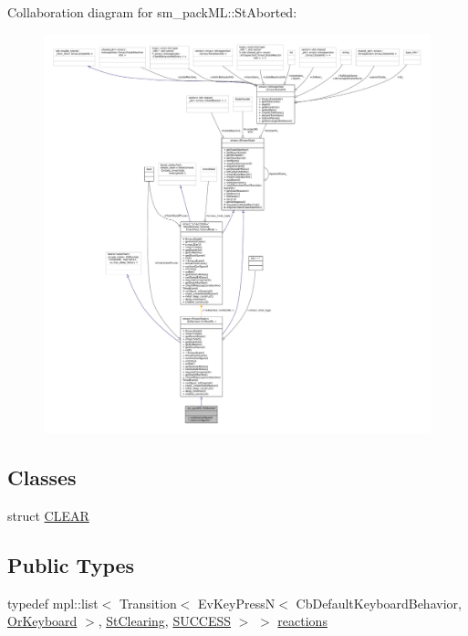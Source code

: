 Collaboration diagram for sm\+\_\+pack\+ML\+:\+:St\+Aborted\+:
\nopagebreak
\begin{figure}[H]
\begin{center}
\leavevmode
\includegraphics[width=350pt]{structsm__packML_1_1StAborted__coll__graph}
\end{center}
\end{figure}
\subsection*{Classes}
\begin{DoxyCompactItemize}
\item 
struct \hyperlink{structsm__packML_1_1StAborted_1_1CLEAR}{C\+L\+E\+AR}
\end{DoxyCompactItemize}
\subsection*{Public Types}
\begin{DoxyCompactItemize}
\item 
typedef mpl\+::list$<$ Transition$<$ Ev\+Key\+PressN$<$ Cb\+Default\+Keyboard\+Behavior, \hyperlink{classsm__packML_1_1OrKeyboard}{Or\+Keyboard} $>$, \hyperlink{structsm__packML_1_1StClearing}{St\+Clearing}, \hyperlink{classSUCCESS}{S\+U\+C\+C\+E\+SS} $>$ $>$ \hyperlink{structsm__packML_1_1StAborted_a0f84557ee52843d034a9672c0741bc89}{reactions}
\end{DoxyCompactItemize}
